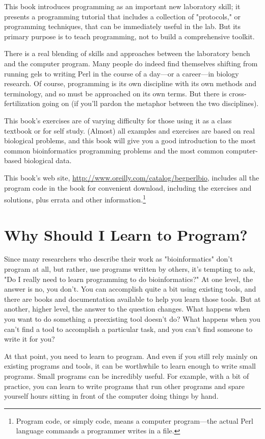 This book introduces programming as an important new laboratory skill; it presents a programming tutorial that includes a collection of "protocols," or programming techniques, that can be immediately useful in the lab. But its primary purpose is to teach programming, not to build a comprehensive toolkit.

There is a real blending of skills and approaches between the laboratory bench and the computer program. Many people do indeed find themselves shifting from running gels to writing Perl in the course of a day—or a career—in biology research. Of course, programming is its own discipline with its own methods and terminology, and so must be approached on its own terms. But there is cross-fertilization going on (if you'll pardon the metaphor between the two disciplines).

This book's exercises are of varying difficulty for those using it as a class textbook or for self study. (Almost) all examples and exercises are based on real biological problems, and this book will give you a good introduction to the most common bioinformatics programming problems and the most common computer-based biological data.

This book's web site, \href{http://www.oreilly.com/catalog/begperlbio}{http://www.oreilly.com/catalog/begperlbio}, includes all the program code in the book for convenient download, including the exercises and solutions, plus errata and other information.\footnote{Program code, or simply code, means a computer program—the actual Perl language commands a programmer writes in a file.} 

\section*{Why Should I Learn to Program?}
Since many researchers who describe their work as "bioinformatics" don't program at all, but rather, use programs written by others, it's tempting to ask, "Do I really need to learn programming to do bioinformatics?" At one level, the answer is no, you don't. You can accomplish quite a bit using existing tools, and there are books and documentation available to help you learn those tools. But at another, higher level, the answer to the question changes. What happens when you want to do something a preexisting tool doesn't do? What happens when you can't find a tool to accomplish a particular task, and you can't find someone to write it for you?

At that point, you need to learn to program. And even if you still rely mainly on existing programs and tools, it can be worthwhile to learn enough to write small programs. Small programs can be incredibly useful.  For example, with a bit of practice, you can learn to write programs that run other programs and spare yourself hours sitting in front of the computer doing things by hand.

